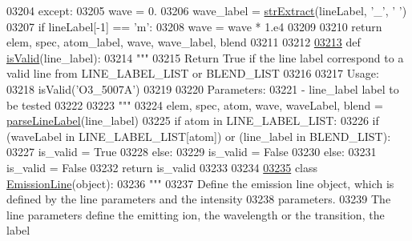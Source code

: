 \begin{DoxyCode}
{{{{{{{{{{{{{{{{{{{{{{03204         \textcolor{keywordflow}{except}:
03205             wave = 0.
03206     wave\_label = \hyperlink{namespacepyneb_1_1utils_1_1misc_aaf9c5249e3c3104e38854ca30f9df4b7}{strExtract}(lineLabel, \textcolor{stringliteral}{'\_'}, \textcolor{stringliteral}{' '})
03207     \textcolor{keywordflow}{if} lineLabel[-1] == \textcolor{stringliteral}{'m'}:
03208         wave = wave * 1.e4
03209     
03210     \textcolor{keywordflow}{return} elem, spec, atom\_label, wave, wave\_label, blend
03211 
03212     
\hypertarget{pynebcore_8py_source_l03213}{}\hyperlink{namespacepyneb_1_1core_1_1pynebcore_a3bc988a0c3e90099888bef4e59f882b1}{03213} \textcolor{keyword}{def }\hyperlink{namespacepyneb_1_1core_1_1pynebcore_a3bc988a0c3e90099888bef4e59f882b1}{isValid}(line\_label):
03214     \textcolor{stringliteral}{"""}
03215 \textcolor{stringliteral}{    Return True if the line label correspond to a valid line from LINE\_LABEL\_LIST or BLEND\_LIST}
03216 \textcolor{stringliteral}{    }
03217 \textcolor{stringliteral}{    Usage:}
03218 \textcolor{stringliteral}{        isValid('O3\_5007A')}
03219 \textcolor{stringliteral}{}
03220 \textcolor{stringliteral}{    Parameters:}
03221 \textcolor{stringliteral}{        - line\_label    label to be tested}
03222 \textcolor{stringliteral}{}
03223 \textcolor{stringliteral}{    """}
03224     elem, spec, atom, wave, waveLabel, blend = \hyperlink{namespacepyneb_1_1core_1_1pynebcore_a9fa8b0b7efdd4da21a816641bf17dcc7}{parseLineLabel}(line\_label)
03225     \textcolor{keywordflow}{if} atom \textcolor{keywordflow}{in} LINE\_LABEL\_LIST:
03226             \textcolor{keywordflow}{if} (waveLabel \textcolor{keywordflow}{in} LINE\_LABEL\_LIST[atom]) \textcolor{keywordflow}{or} (line\_label \textcolor{keywordflow}{in} BLEND\_LIST):
03227                 is\_valid = \textcolor{keyword}{True}
03228             \textcolor{keywordflow}{else}:
03229                 is\_valid = \textcolor{keyword}{False}
03230     \textcolor{keywordflow}{else}:
03231         is\_valid = \textcolor{keyword}{False}
03232     \textcolor{keywordflow}{return} is\_valid
03233 
03234 
\hypertarget{pynebcore_8py_source_l03235}{}\hyperlink{classpyneb_1_1core_1_1pynebcore_1_1_emission_line}{03235} \textcolor{keyword}{class }\hyperlink{classpyneb_1_1core_1_1pynebcore_1_1_emission_line}{EmissionLine}(object):
03236     \textcolor{stringliteral}{"""}
03237 \textcolor{stringliteral}{    Define the emission line object, which is defined by the line parameters and the intensity }
03238 \textcolor{stringliteral}{        parameters.}
03239 \textcolor{stringliteral}{    The line parameters define the emitting ion, the wavelength or the transition, the label }
}}}}}}}}}}}}}}}}}}}}}}
\end{DoxyCode}
